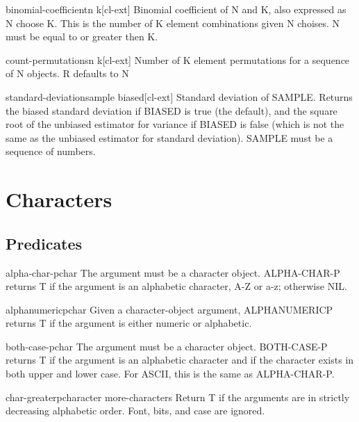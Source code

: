 \documentclass[10pt,english]{book}
\begin{document}
\begin{function}{binomial-coefficient}{n k}[cl-ext]
  Binomial coefficient of N and K, also expressed as N choose K. This is the
number of K element combinations given N choises. N must be equal to or
greater then K.
\end{function}

\begin{function}{count-permutations}{n \op k}[cl-ext]
  Number of K element permutations for a sequence of N objects.
R defaults to N
\end{function}

\begin{function}{standard-deviation}{sample \key biased}[cl-ext]
  Standard deviation of SAMPLE. Returns the biased standard deviation if
BIASED is true (the default), and the square root of the unbiased estimator
for variance if BIASED is false (which is not the same as the unbiased
estimator for standard deviation). SAMPLE must be a sequence of numbers.
\end{function}



\chapter{Characters}

\section{Predicates}
\label{sec:character-predicates}

\begin{function}{alpha-char-p}{char}
  The argument must be a character object. ALPHA-CHAR-P returns T if the
   argument is an alphabetic character, A-Z or a-z; otherwise NIL.
\end{function}

\begin{function}{alphanumericp}{char}
  Given a character-object argument, ALPHANUMERICP returns T if the
   argument is either numeric or alphabetic.
\end{function}

\begin{function}{both-case-p}{char}
  The argument must be a character object. BOTH-CASE-P returns T if the
  argument is an alphabetic character and if the character exists in
  both upper and lower case. For ASCII, this is the same as ALPHA-CHAR-P.
\end{function}

\begin{function}{char-greaterp}{character \rest more-characters}
  Return T if the arguments are in strictly decreasing alphabetic order.
   Font, bits, and case are ignored.
\end{function}
\end{document}
